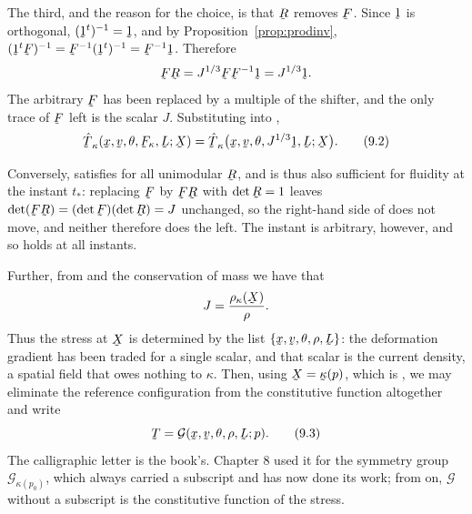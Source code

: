 The third, and the reason for the choice, is that $\bR$ removes $\bF$.
Since $\shift$ is orthogonal, $(\shift^{t})^{-1}=\shift$, and by
Proposition~\ref{prop:prodinv},
$(\shift^{t}\bF)^{-1}=\bF^{-1}(\shift^{t})^{-1}=\bF^{-1}\shift$.
Therefore
\[
   \bF\bR=J^{1/3}\bF\bF^{-1}\shift=J^{1/3}\shift .
\]
The arbitrary $\bF$ has been replaced by a multiple of the shifter, and
the only trace of $\bF$ left is the scalar $J$. Substituting into
,
\begin{equation}
   \hat\bT_{\kappa}(\bx,\bv,\theta,\bF_{\kappa},\bL;\bX)
   =\hat\bT_{\kappa}\big(\bx,\bv,\theta,J^{1/3}\shift,\bL;\bX\big).
   \tag{9.2}\label{eq:9.2}
\end{equation}

Conversely,  satisfies  for all unimodular $\bR$, and
is thus also sufficient for fluidity at the instant $t_{*}$: replacing
$\bF$ by $\bF\bR$ with $\det\bR=1$ leaves
$\det(\bF\bR)=(\det\bF)(\det\bR)=J$ unchanged, so the right-hand side
of  does not move, and neither therefore does the left. The
instant is arbitrary, however, and so  holds at all instants.

Further, from  and the conservation of mass  we have
that
\[
   J=\frac{\rho_{\kappa}(\bX)}{\rho} .
\]
Thus the stress at $\bX$ is determined by the list
$\{\bx,\bv,\theta,\rho,\bL\}$: the deformation gradient has been traded
for a single scalar, and that scalar is the current density, a spatial
field that owes nothing to $\kappa$. Then, using $\bX=\bkappa(p)$, which
is , we may eliminate the reference configuration from the
constitutive function altogether and write
\begin{equation}
   \bT=\mathcal{G}(\bx,\bv,\theta,\rho,\bL;p).
   \tag{9.3}\label{eq:9.3}
\end{equation}
The calligraphic letter is the book's. Chapter 8 used it for the
symmetry group $\mathcal{G}_{\kappa(p_{0})}$, which always carried a
subscript and has now done its work; from  on, $\mathcal{G}$
without a subscript is the constitutive function of the stress.

